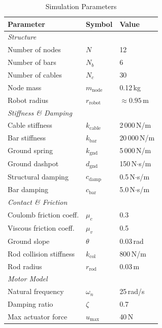 \begin{table}[htbp]
\centering
\caption{Simulation Parameters}
\label{tab:sim_params}
\begin{tabular}{l l l}
\hline
\textbf{Parameter} & \textbf{Symbol} & \textbf{Value} \\
\hline
\multicolumn{3}{l}{\textit{Structure}} \\
Number of nodes            & $N$              & 12 \\
Number of bars             & $N_b$            & 6 \\
Number of cables           & $N_c$            & 30 \\
Node mass                  & $m_{\mathrm{node}}$ & 0.12\,kg \\
Robot radius               & $r_{\mathrm{robot}}$ & $\approx 0.95$\,m \\
\hline
\multicolumn{3}{l}{\textit{Stiffness \& Damping}} \\
Cable stiffness            & $k_{\mathrm{cable}}$ & 2\,000\,N/m \\
Bar stiffness              & $k_{\mathrm{bar}}$   & 20\,000\,N/m \\
Ground spring              & $k_{\mathrm{gnd}}$   & 5\,000\,N/m \\
Ground dashpot             & $d_{\mathrm{gnd}}$   & 150\,N$\cdot$s/m \\
Structural damping         & $c_{\mathrm{damp}}$  & 0.5\,N$\cdot$s/m \\
Bar damping                & $c_{\mathrm{bar}}$   & 5.0\,N$\cdot$s/m \\
\hline
\multicolumn{3}{l}{\textit{Contact \& Friction}} \\
Coulomb friction coeff.    & $\mu_c$          & 0.3 \\
Viscous friction coeff.    & $\mu_v$          & 0.5 \\
Ground slope               & $\theta$         & 0.03\,rad \\
Rod collision stiffness    & $k_{\mathrm{col}}$ & 800\,N/m \\
Rod radius                 & $r_{\mathrm{rod}}$ & 0.03\,m \\
\hline
\multicolumn{3}{l}{\textit{Motor Model}} \\
Natural frequency          & $\omega_n$       & 25\,rad/s \\
Damping ratio              & $\zeta$          & 0.7 \\
Max actuator force         & $u_{\max}$       & 40\,N \\

\end{tabular}
\end{table}
